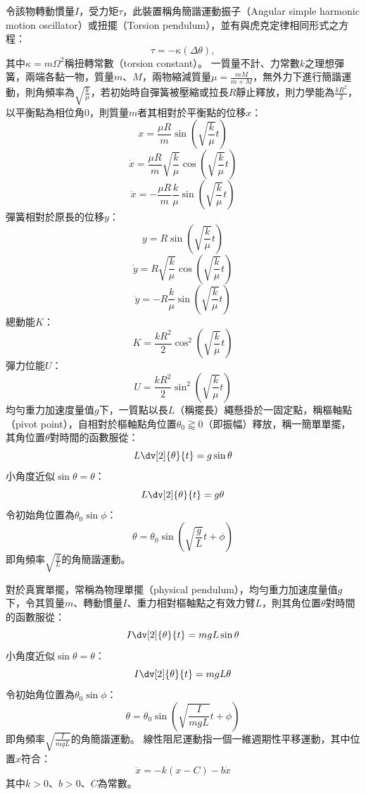 \documentclass[a4paper,12pt]{article}
\begin{document}
令該物轉動慣量$I$，受力矩$\tau$，此裝置稱角簡諧運動振子（Angular simple harmonic motion oscillator）或扭擺（Torsion pendulum），並有與虎克定律相同形式之方程：
\[\tau=-\kappa(\Delta \theta),\]
其中$\kappa=m\Omega^2$稱扭轉常數（torsion constant）。
一質量不計、力常數$k$之理想彈簧，兩端各黏一物，質量$m$、$M$，兩物縮減質量$\mu=\frac{mM}{m+M}$，無外力下進行簡諧運動，則角頻率為$\sqrt{\frac{k}{\mu}}$，若初始時自彈簧被壓縮或拉長$R$靜止釋放，則力學能為$\frac{kR^2}{2}$，以平衡點為相位角$0$，則質量$m$者其相對於平衡點的位移$x$：
\[x=\frac{\mu R}{m}\sin(\sqrt{\frac{k}{\mu}}t)\]
\[\dot{x}=\frac{\mu R}{m}\sqrt{\frac{k}{\mu}}\cos(\sqrt{\frac{k}{\mu}}t)\]
\[\ddot{x}=-\frac{\mu R}{m}\frac{k}{\mu}\sin(\sqrt{\frac{k}{\mu}}t)\]
彈簧相對於原長的位移$y$：
\[y=R\sin(\sqrt{\frac{k}{\mu}}t)\]
\[\dot{y}=R\sqrt{\frac{k}{\mu}}\cos(\sqrt{\frac{k}{\mu}}t)\]
\[\ddot{y}=-R\frac{k}{\mu}\sin(\sqrt{\frac{k}{\mu}}t)\]
總動能$K$：
\[K=\frac{kR^2}{2}\cos^2(\sqrt{\frac{k}{\mu}}t)\]
彈力位能$U$：
\[U=\frac{kR^2}{2}\sin^2(\sqrt{\frac{k}{\mu}}t)\]
均勻重力加速度量值$g$下，一質點以長$L$（稱擺長）繩懸掛於一固定點，稱樞軸點（pivot point），自相對於樞軸點角位置$\theta_0\gtrapprox 0$（即振幅）釋放，稱一簡單單擺，其角位置$\theta$對時間的函數服從：
\[L\dv[2]{\theta}{t}=g\sin\theta\]
小角度近似$\sin\theta=\theta$：
\[L\dv[2]{\theta}{t}=g\theta\]
令初始角位置為$\theta_0\sin\phi$：
\[\theta=\theta_0\sin(\sqrt{\frac{g}{L}} t+\phi)\]
即角頻率$\sqrt{\frac{g}{L}}$的角簡諧運動。

對於真實單擺，常稱為物理單擺（physical pendulum），均勻重力加速度量值$g$下，令其質量$m$、轉動慣量$I$、重力相對樞軸點之有效力臂$L$，則其角位置$\theta$對時間的函數服從：
\[I\dv[2]{\theta}{t}=mgL\sin\theta\]
小角度近似$\sin\theta=\theta$：
\[I\dv[2]{\theta}{t}=mgL\theta\]
令初始角位置為$\theta_0\sin\phi$：
\[\theta=\theta_0\sin(\sqrt{\frac{I}{mgL}} t+\phi)\]
即角頻率$\sqrt{\frac{I}{mgL}}$的角簡諧運動。
線性阻尼運動指一個一維週期性平移運動，其中位置$x$符合：
\[\ddot{x}=-k(x-C)-b\dot{x}\]
其中$k>0$、$b>0$、$C$為常數。
\end{document}
